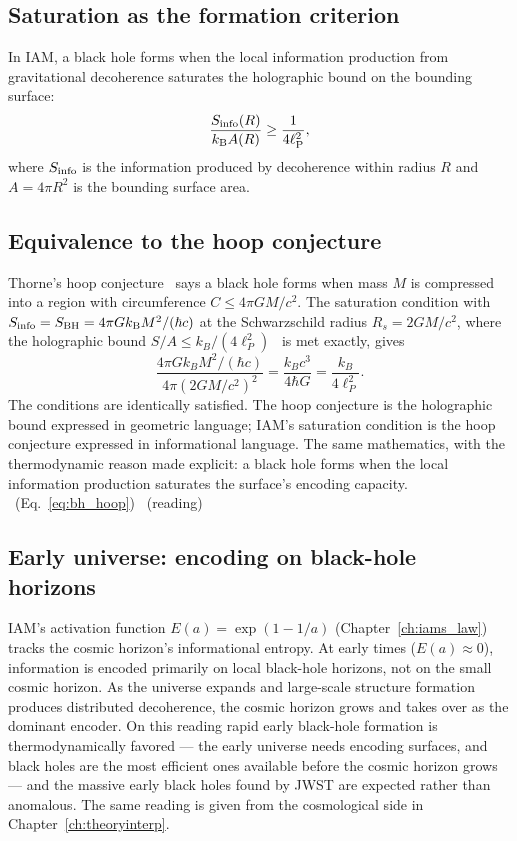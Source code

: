 \subsection{Saturation as the formation criterion}
In IAM, a black hole forms when the local information production from gravitational decoherence saturates the holographic bound on the bounding
surface:
\begin{equation}
\frac{S_{\rm info}(R)}{k_{\mathrm B} A(R)}\ge\frac{1}{4\ell_{\mathrm P}^2},\label{eq:bh_saturation}
\end{equation}
where $S_{\rm info}$ is the information produced by decoherence within radius $R$ and $A=4\pi R^2$ is the bounding surface area. \conjecture

\subsection{Equivalence to the hoop conjecture}
Thorne's hoop conjecture~\cite{Thorne1972} says a black hole forms when mass $M$ is compressed into a region with circumference $C\le4\pi GM/c^2$. The saturation
condition with $S_{\rm info}=S_{\rm BH}=4\pi Gk_{\mathrm B} M^2/(\hbar c)$ at the Schwarzschild radius $R_s=2GM/c^2$, where the holographic bound
$S/A\le k_B/(4\ell_P^2)$~\cite{Bousso2002} is met exactly, gives
\begin{equation}
\frac{4\pi Gk_BM^2/(\hbar c)}{4\pi(2GM/c^2)^2}=\frac{k_Bc^3}{4\hbar G}=\frac{k_B}{4\ell_P^2}.\label{eq:bh_hoop}
\end{equation}
The conditions are identically satisfied. The hoop conjecture is the holographic bound expressed in geometric language; IAM's saturation condition is the
hoop conjecture expressed in informational language. The same mathematics, with the thermodynamic reason made explicit: a black hole forms when the
local information production saturates the surface's encoding capacity. \derived\ (Eq.~\eqref{eq:bh_hoop}) \interp\ (reading)

\subsection{Early universe: encoding on black-hole horizons}
IAM's activation function $E(a)=\exp(1-1/a)$ (Chapter~\ref{ch:iams_law}) tracks the cosmic horizon's informational entropy. At early times ($E(a)\approx0$),
information is encoded primarily on local black-hole horizons, not on the small cosmic horizon. As the universe expands and large-scale structure formation
produces distributed decoherence, the cosmic horizon grows and takes over as the dominant encoder. On this reading rapid early black-hole formation is
thermodynamically favored --- the early universe needs encoding surfaces, and black holes are the most efficient ones available before the cosmic horizon
grows --- and the massive early black holes found by JWST are expected rather than anomalous. The same reading is given from the cosmological
side in Chapter~\ref{ch:theoryinterp}. \conjecture


